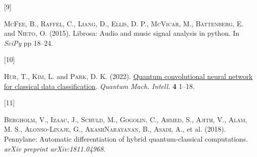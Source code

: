 \documentclass[
  13pt,
  a4paper,
  DIV=11,
  numbers=noendperiod,
  oneside]{scrreprt}
\newlength{\cslhangindent}
\newlength{\csllabelwidth}
\newenvironment{CSLReferences}[2] %
 {\begin{list}{}{%
  \setlength{\itemindent}{0pt}
  \setlength{\leftmargin}{0pt}
  \setlength{\parsep}{0pt}
  \ifodd #1
   \setlength{\leftmargin}{\cslhangindent}
   \setlength{\itemindent}{-1\cslhangindent}
  \fi
  \setlength{\itemsep}{#2\baselineskip}}}
 {\end{list}}
\newcommand{\CSLLeftMargin}[1]{\parbox[t]{\csllabelwidth}{\strut#1\strut}}
\newcommand{\CSLRightInline}[1]{\parbox[t]{\linewidth - \csllabelwidth}{\strut#1\strut}}
\begin{document}
\begin{CSLReferences}{0}{1}
\CSLLeftMargin{{[}9{]} }%
\CSLRightInline{\textsc{McFee}, B., \textsc{Raffel}, C., \textsc{Liang},
D., \textsc{Ellis}, D. P., \textsc{McVicar}, M., \textsc{Battenberg}, E.
and \textsc{Nieto}, O. (2015). Librosa: Audio and music signal analysis
in python. In \emph{SciPy} pp 18--24.}

\CSLLeftMargin{{[}10{]} }%
\CSLRightInline{\textsc{Hur}, T., \textsc{Kim}, L. and \textsc{Park}, D.
K. (2022). \href{https://doi.org/10.1007/s42484-021-00061-x}{{Quantum
convolutional neural network for classical data classification}}.
\emph{Quantum Mach. Intell.} \textbf{4} 1--18.}

\CSLLeftMargin{{[}11{]} }%
\CSLRightInline{\textsc{Bergholm}, V., \textsc{Izaac}, J.,
\textsc{Schuld}, M., \textsc{Gogolin}, C., \textsc{Ahmed}, S.,
\textsc{Ajith}, V., \textsc{Alam}, M. S., \textsc{Alonso-Linaje}, G.,
\textsc{AkashNarayanan}, B., \textsc{Asadi}, A., et al. (2018).
Pennylane: Automatic differentiation of hybrid quantum-classical
computations. \emph{arXiv preprint arXiv:1811.04968}.}

\end{CSLReferences}
\end{document}
